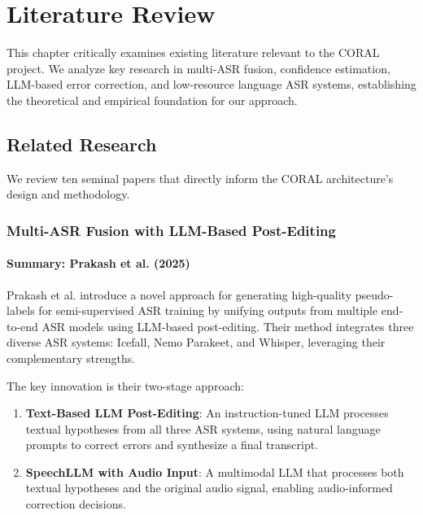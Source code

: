 \chapter{Literature Review}
\label{sec:literature}

This chapter critically examines existing literature relevant to the CORAL project. We analyze key research in multi-ASR fusion, confidence estimation, LLM-based error correction, and low-resource language ASR systems, establishing the theoretical and empirical foundation for our approach.

\section{Related Research}

We review ten seminal papers that directly inform the CORAL architecture's design and methodology.

\subsection{Multi-ASR Fusion with LLM-Based Post-Editing}

\subsubsection{Summary: Prakash et al. (2025)}

Prakash et al. \cite{prakash2025} introduce a novel approach for generating high-quality pseudo-labels for semi-supervised ASR training by unifying outputs from multiple end-to-end ASR models using LLM-based post-editing. Their method integrates three diverse ASR systems: Icefall, Nemo Parakeet, and Whisper, leveraging their complementary strengths.

The key innovation is their two-stage approach:

\begin{enumerate}[topsep=6pt,itemsep=3pt]
    \item \textbf{Text-Based LLM Post-Editing}: An instruction-tuned LLM processes textual hypotheses from all three ASR systems, using natural language prompts to correct errors and synthesize a final transcript.
    
    \item \textbf{SpeechLLM with Audio Input}: A multimodal LLM that processes both textual hypotheses and the original audio signal, enabling audio-informed correction decisions.
\end{enumerate}

